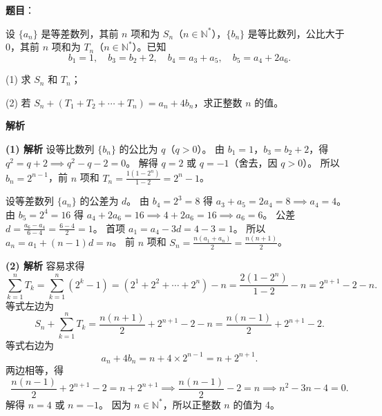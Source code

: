 \begin{answer}

\textbf{题目}：

设 $\{a_n\}$ 是等差数列，其前 $n$ 项和为 $S_n$（$n\in\mathbb N^*$），$\{b_n\}$ 是等比数列，公比大于 0，其前 $n$ 项和为 $T_n$（$n\in\mathbb N^*$）。已知
\nopagebreak[4]
\[
b_1=1,\quad b_3=b_2+2,\quad b_4=a_3+a_5,\quad b_5=a_4+2a_6.
\]

(1) 求 $S_n$ 和 $T_n$；

(2) 若 $S_n+(T_1+T_2+\cdots+T_n)=a_n+4b_n$，求正整数 $n$ 的值。

\textbf{解析}

\textbf{(1) 解析} 设等比数列 $\{b_n\}$ 的公比为 $q$（$q>0$）。
由 $b_1=1$，$b_3=b_2+2$，得 $q^2=q+2\implies q^2-q-2=0$。
解得 $q=2$ 或 $q=-1$（舍去，因 $q>0$）。
所以 $b_n=2^{n-1}$，前 $n$ 项和 $T_n=\frac{1(1-2^n)}{1-2}=2^n-1$。

设等差数列 $\{a_n\}$ 的公差为 $d$。
由 $b_4=2^3=8$ 得 $a_3+a_5=2a_4=8\implies a_4=4$。
由 $b_5=2^4=16$ 得 $a_4+2a_6=16\implies 4+2a_6=16\implies a_6=6$。
公差 $d=\frac{a_6-a_4}{6-4}=\frac{6-4}{2}=1$。
首项 $a_1=a_4-3d=4-3=1$。
所以 $a_n=a_1+(n-1)d=n$。
前 $n$ 项和 $S_n=\frac{n(a_1+a_n)}{2}=\frac{n(n+1)}{2}$。

\textbf{(2) 解析} 容易求得
\nopagebreak[4]
\[\sum_{k=1}^n T_k=\sum_{k=1}^n(2^k-1)=(2^1+2^2+\cdots+2^n)-n=\frac{2(1-2^n)}{1-2}-n=2^{n+1}-2-n.\]
等式左边为
\nopagebreak[4]
\[S_n+\sum_{k=1}^n T_k=\frac{n(n+1)}{2}+2^{n+1}-2-n=\frac{n(n-1)}{2}+2^{n+1}-2.\]
等式右边为
\nopagebreak[4]
\[a_n+4b_n=n+4\times 2^{n-1}=n+2^{n+1}.\]
两边相等，得
\nopagebreak[4]
\[\frac{n(n-1)}{2}+2^{n+1}-2=n+2^{n+1}\implies\frac{n(n-1)}{2}-2=n\implies n^2-3n-4=0.\]
解得 $n=4$ 或 $n=-1$。
因为 $n\in\mathbb N^*$，所以正整数 $n$ 的值为 4。



\end{answer}
